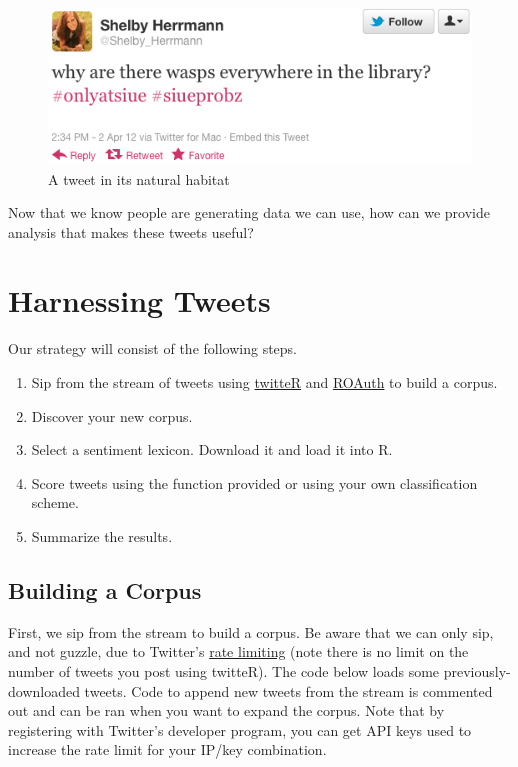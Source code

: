 \documentclass[letterpaper, 12pt]{article}
\begin{document}
\begin{figure}[htbp]
\centering
\includegraphics{tweet.png}
\caption{A tweet in its natural habitat}
\end{figure}

Now that we know people are generating data we can use, how can we provide analysis that makes these tweets useful?

\section{Harnessing Tweets}
Our strategy will consist of the following steps.

\begin{enumerate}
\item Sip from the stream of tweets using \href{http://cran.r-project.org/web/packages/twitteR/index.html}{twitteR} and \href{http://cran.r-project.org/web/packages/ROAuth/index.html}{ROAuth} to build a corpus.

\item Discover your new corpus.

\item Select a sentiment lexicon. Download it and load it into R.

\item Score tweets using the function provided or using your own classification scheme.

\item Summarize the results.
\end{enumerate}

\subsection{Building a Corpus}
First, we sip from the stream to build a corpus. Be aware that we can only sip, and not guzzle, due to Twitter's \href{https://dev.twitter.com/docs/rate-limiting}{rate limiting} (note there is no limit on the number of tweets you post using twitteR). The code below loads some previously-downloaded tweets. Code to append new tweets from the stream is commented out and can be ran when you want to expand the corpus. Note that by registering with Twitter's developer program, you can get API keys used to increase the rate limit for your IP/key combination.
\end{document}
